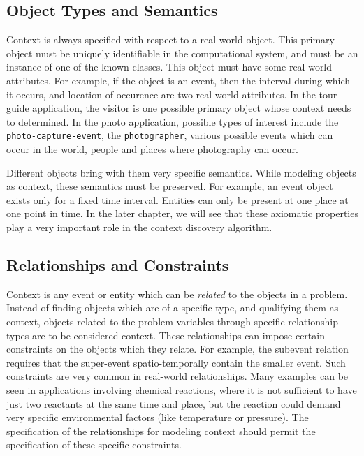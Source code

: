 
\subsection{Object Types and Semantics}

Context is always specified with respect to a real world object. This primary object must be uniquely identifiable in the computational system, and must be an instance of one of the known classes. This object must have some real world attributes. For example, if the object is an event, then the interval during which it occurs, and location of occurence are two real world attributes. In the tour guide application, the visitor is one possible primary object whose context needs to determined. In the photo application, possible types of interest include the \texttt{photo-capture-event}, the \texttt{photographer}, various possible events which can occur in the world, people and places where photography can occur.

Different objects bring with them very specific semantics. While modeling objects as context, these semantics must be preserved. For example, an event object exists only for a fixed time interval. Entities can only be present at one place at one point in time. In the later chapter, we will see that these axiomatic properties play a very important role in the context discovery algorithm.

\subsection{Relationships and Constraints}
Context is any event or entity which can be \textit{related} to the objects in a problem. Instead of finding objects which are of a specific type, and qualifying them as context, objects related to the problem variables through specific relationship types are to be considered context. These relationships can impose certain constraints on the objects which they relate. For example, the subevent relation requires that the super-event spatio-temporally contain the smaller event. Such constraints are very common in real-world relationships. Many examples can be seen in applications involving chemical reactions, where it is not sufficient to have just two reactants at the same time and place, but the reaction could demand very specific environmental factors (like temperature or pressure). The specification of the relationships for modeling context should permit the specification of these specific constraints.

